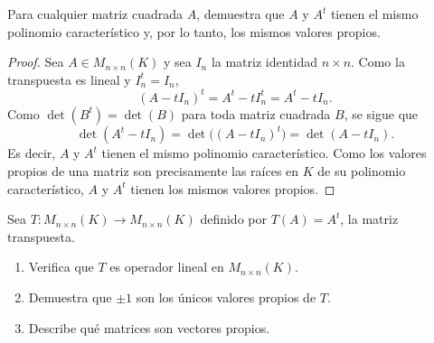 \documentclass[12pt,a4paper]{article}
\begin{document}
    \thispagestyle{empty}
    

    \begin{problema}
        Para cualquier matriz cuadrada $A$, demuestra que $A$ y $A^{t}$ tienen el mismo polinomio característico y, por lo tanto, los mismos valores propios.
    \end{problema}

    \begin{proof}
        Sea $A\in M_{n\times n}(K)$ y sea $I_{n}$ la matriz identidad $n\times n$. Como la transpuesta es lineal y $I_{n}^{t}=I_{n}$,
        \begin{equation*}
            (A-tI_{n})^{t}=A^{t}-tI_{n}^{t}=A^{t}-tI_{n}.
        \end{equation*}
        Como $\det(B^{t})=\det(B)$ para toda matriz cuadrada $B$, se sigue que
        \begin{equation*}
            \det(A^{t}-tI_{n})=\det\big((A-tI_{n})^{t}\big)=\det(A-tI_{n}).
        \end{equation*}
        Es decir, $A$ y $A^{t}$ tienen el mismo polinomio característico. Como los valores propios de una matriz son precisamente las raíces en $K$ de su polinomio característico, $A$ y $A^{t}$ tienen los mismos valores propios.
    \end{proof}

    \begin{problema}
        Sea $T:M_{n\times n}(K)\to M_{n\times n}(K)$ definido por $T(A)=A^{t}$, la matriz transpuesta.
        \begin{enumerate}[label=(\alph*)]
            \item Verifica que $T$ es operador lineal en $M_{n\times n}(K)$.
            \item Demuestra que $\pm1$ son los únicos valores propios de $T$.
            \item Describe qué matrices son vectores propios.
        \end{enumerate}
    \end{problema}
\end{document}
